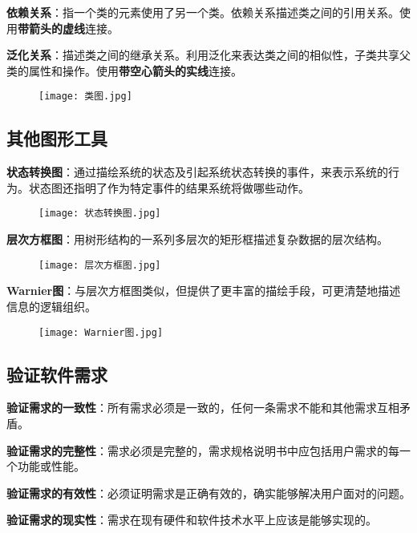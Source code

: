 \documentclass[cn, blue, normal, 12pt]{elegantnote}
\begin{document}
\textbf{依赖关系}：指一个类的元素使用了另一个类。依赖关系描述类之间的引用关系。使用\textbf{带箭头的虚线}连接。

\textbf{泛化关系}：描述类之间的继承关系。利用泛化来表达类之间的相似性，子类共享父类的属性和操作。使用\textbf{带空心箭头的实线}连接。

\begin{figure}[htbp]
    \centering
    \texttt{[image: 类图.jpg]}
\end{figure}

\subsection{其他图形工具}

\textbf{状态转换图}：通过描绘系统的状态及引起系统状态转换的事件，来表示系统的行为。状态图还指明了作为特定事件的结果系统将做哪些动作。

\begin{figure}[htbp]
    \centering
    \texttt{[image: 状态转换图.jpg]}
\end{figure}

\textbf{层次方框图}：用树形结构的一系列多层次的矩形框描述复杂数据的层次结构。

\begin{figure}[htbp]
    \centering
    \texttt{[image: 层次方框图.jpg]}
\end{figure}

\textbf{Warnier图}：与层次方框图类似，但提供了更丰富的描绘手段，可更清楚地描述信息的逻辑组织。

\begin{figure}[htbp]
    \centering
    \texttt{[image: Warnier图.jpg]}
\end{figure}

\subsection{验证软件需求}

\textbf{验证需求的一致性}：所有需求必须是一致的，任何一条需求不能和其他需求互相矛盾。

\textbf{验证需求的完整性}：需求必须是完整的，需求规格说明书中应包括用户需求的每一个功能或性能。

\textbf{验证需求的有效性}：必须证明需求是正确有效的，确实能够解决用户面对的问题。

\textbf{验证需求的现实性}：需求在现有硬件和软件技术水平上应该是能够实现的。
\end{document}
